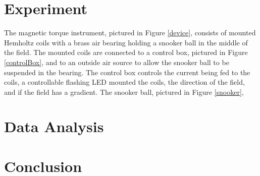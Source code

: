 \documentclass[aps,prl,10pt,twocolumn,floatfix]{revtex4-2}
\begin{document}

\section{Experiment}
The magnetic torque instrument, pictured in Figure \ref{device}, consists of mounted Hemholtz coils with a brass air bearing holding a snooker ball in the middle of the field. 
The mounted coils are connected to a control box, pictured in Figure \ref{controlBox}, and to an outside air source to allow the snooker ball to be suspended in the bearing. 
The control box controls the current being fed to the coils, a controllable flashing LED mounted the coils, the direction of the field, and if the field has a gradient. 
The snooker ball, pictured in Figure \ref{snooker}, 







\section{Data Analysis}


\section{Conclusion}




\end{document}

